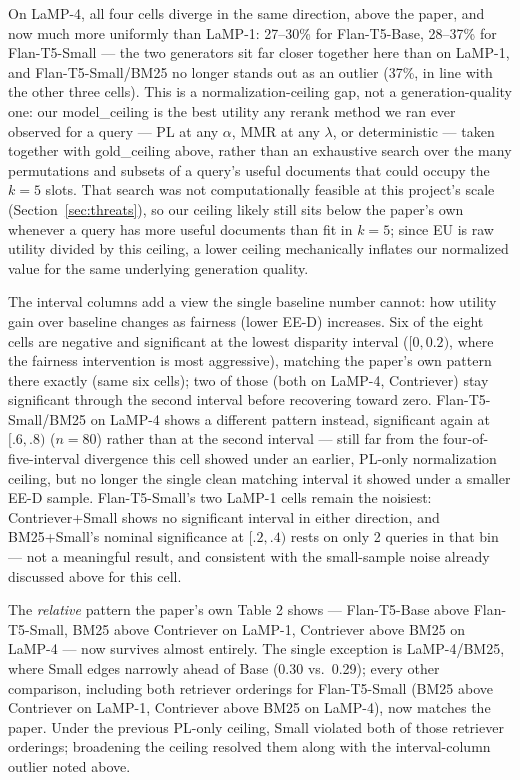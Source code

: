 \documentclass[10pt,twocolumn]{article}
\begin{document}
On LaMP-4, all four cells diverge in the same direction, above the paper, and now
much more uniformly than LaMP-1: 27--30\% for Flan-T5-Base, 28--37\% for
Flan-T5-Small --- the two generators sit far closer together here than on LaMP-1,
and Flan-T5-Small/BM25 no longer stands out as an outlier (37\%, in line with the
other three cells). This is a normalization-ceiling gap, not a generation-quality
one: our model\_ceiling is the best utility any rerank method we ran ever observed
for a query --- PL at any $\alpha$, MMR at any $\lambda$, or deterministic ---
taken together with gold\_ceiling above, rather than an exhaustive search over the
many permutations and subsets of a query's useful documents that could occupy the
$k{=}5$ slots. That search was not computationally feasible at this project's scale
(Section~\ref{sec:threats}), so our ceiling likely still sits below the paper's own
whenever a query has more useful documents than fit in $k{=}5$; since EU is raw
utility divided by this ceiling, a lower ceiling mechanically inflates our
normalized value for the same underlying generation quality.

The interval columns add a view the single baseline number cannot: how utility gain
over baseline changes as fairness (lower EE-D) increases. Six of the eight cells are
negative and significant at the lowest disparity interval ($[0,0.2)$, where the
fairness intervention is most aggressive), matching the paper's own pattern there
exactly (same six cells); two of those (both on LaMP-4, Contriever) stay significant
through the second interval before recovering toward zero. Flan-T5-Small/BM25 on
LaMP-4 shows a different pattern instead, significant again at $[.6,.8)$
($n{=}80$) rather than at the second interval --- still far from the
four-of-five-interval divergence this cell showed under an earlier, PL-only
normalization ceiling, but no longer the single clean matching interval it showed
under a smaller EE-D sample. Flan-T5-Small's two LaMP-1 cells remain the noisiest:
Contriever+Small shows no significant interval in either direction, and
BM25+Small's nominal significance at $[.2,.4)$ rests on only 2 queries in that bin
--- not a meaningful result, and consistent with the small-sample noise already
discussed above for this cell.

The \emph{relative} pattern the paper's own Table 2 shows --- Flan-T5-Base above
Flan-T5-Small, BM25 above Contriever on LaMP-1, Contriever above BM25 on LaMP-4 ---
now survives almost entirely. The single exception is LaMP-4/BM25, where Small edges
narrowly ahead of Base (0.30 vs.\ 0.29); every other comparison, including both
retriever orderings for Flan-T5-Small (BM25 above Contriever on LaMP-1, Contriever
above BM25 on LaMP-4), now matches the paper. Under the previous PL-only ceiling,
Small violated both of those retriever orderings; broadening the ceiling resolved
them along with the interval-column outlier noted above.
\end{document}
